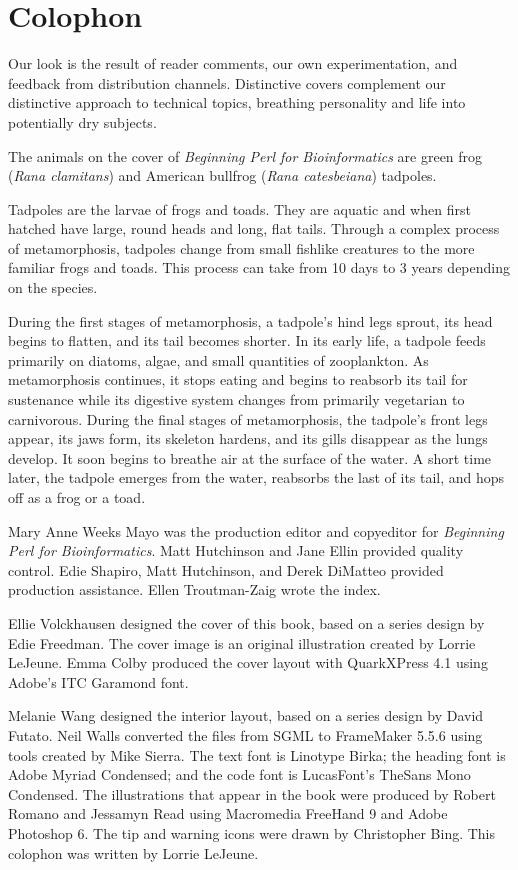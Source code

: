 \chapter{Colophon}
\label{chap:colophon}
\minitoc

Our look is the result of reader comments, our own experimentation, and feedback from distribution channels. Distinctive covers complement our distinctive approach to technical topics, breathing personality and life into potentially dry subjects.

The animals on the cover of \textit{Beginning Perl for Bioinformatics} are green frog (\textit{Rana clamitans}) and American bullfrog (\textit{Rana catesbeiana}) tadpoles.

Tadpoles are the larvae of frogs and toads. They are aquatic and when first hatched have large, round heads and long, flat tails. Through a complex process of metamorphosis, tadpoles change from small fishlike creatures to the more familiar frogs and toads. This process can take from 10 days to 3 years depending on the species.

During the first stages of metamorphosis, a tadpole's hind legs sprout, its head begins to flatten, and its tail becomes shorter. In its early life, a tadpole feeds primarily on diatoms, algae, and small quantities of zooplankton. As metamorphosis continues, it stops eating and begins to reabsorb its tail for sustenance while its digestive system changes from primarily vegetarian to carnivorous. During the final stages of metamorphosis, the tadpole's front legs appear, its jaws form, its skeleton hardens, and its gills disappear as the lungs develop. It soon begins to breathe air at the surface of the water. A short time later, the tadpole emerges from the water, reabsorbs the last of its tail, and hops off as a frog or a toad.

Mary Anne Weeks Mayo was the production editor and copyeditor for \textit{Beginning Perl for Bioinformatics}. Matt Hutchinson and Jane Ellin provided quality control. Edie Shapiro, Matt Hutchinson, and Derek DiMatteo provided production assistance. Ellen Troutman-Zaig wrote the index.

Ellie Volckhausen designed the cover of this book, based on a series design by Edie Freedman. The cover image is an original illustration created by Lorrie LeJeune. Emma Colby produced the cover layout with Quark\texttrademark XPress 4.1 using Adobe's ITC Garamond font.

Melanie Wang designed the interior layout, based on a series design by David Futato. Neil Walls converted the files from SGML to FrameMaker 5.5.6 using tools created by Mike Sierra. The text font is Linotype Birka; the heading font is Adobe Myriad Condensed; and the code font is LucasFont's TheSans Mono Condensed. The illustrations that appear in the book were produced by Robert Romano and Jessamyn Read using Macromedia FreeHand 9 and Adobe Photoshop 6. The tip and warning icons were drawn by Christopher Bing. This colophon was written by Lorrie LeJeune.
